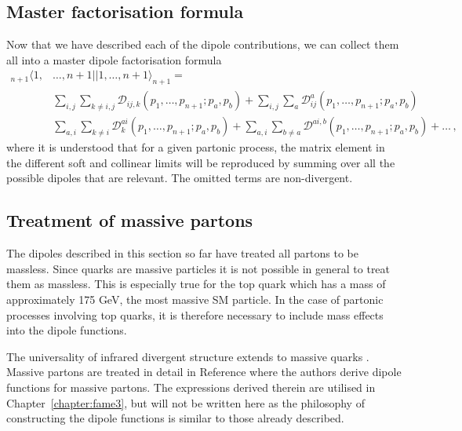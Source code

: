 \documentclass[main.tex]{subfiles}
\begin{document}
    \subsection{Master factorisation formula}
        Now that we have described each of the dipole contributions,
        we can collect them all into a master dipole factorisation
        formula
        \begin{equation}\label{eqn:dipole_factorisation_master}
            \begin{split}
            {}_{n+1} \langle 1, &\ldots, n+1 || 1, \ldots, n+1 \rangle_{n+1} = \\
            &\sum_{i,j}\sum_{k \neq i, j} \mathcal{D}_{ij,k}(p_{1},\ldots,p_{n+1};p_{a},p_{b}) + \sum_{i,j}\sum_{a} \mathcal{D}_{ij}^{a}(p_{1},\ldots,p_{n+1};p_{a},p_{b}) \\
            &\sum_{a,i}\sum_{k \neq i} \mathcal{D}_{k}^{ai}(p_{1},\ldots,p_{n+1};p_{a},p_{b}) + \sum_{a,i}\sum_{b \neq a} \mathcal{D}^{ai,b}(p_{1},\ldots,p_{n+1};p_{a},p_{b}) + \ldots \, ,
            \end{split}
        \end{equation}
        where it is understood that for a given partonic process,
        the matrix element in the different soft and collinear limits will be
        reproduced by summing over all the possible dipoles that are
        relevant. The omitted  terms are non-divergent.

    \subsection{Treatment of massive partons}
        The dipoles described in this section so far have
        treated all partons to be massless. Since quarks are massive
        particles it is not possible in general to treat them
        as massless. This is especially true for the top
        quark which has a mass of approximately 175 GeV, the
        most massive SM particle. In the case of partonic
        processes involving top quarks, it is therefore
        necessary to include mass effects into the dipole
        functions.

        The universality of infrared divergent structure
        extends to massive quarks \cite{Catani:2000ef}.
        Massive partons are treated in detail in Reference\cite{Catani:2002hc}
        where the authors derive dipole
        functions for massive partons. The expressions derived therein
        are utilised in Chapter~\ref{chapter:fame3}, but will
        not be written here as the philosophy of constructing
        the dipole functions is similar to those already described.
\end{document}
